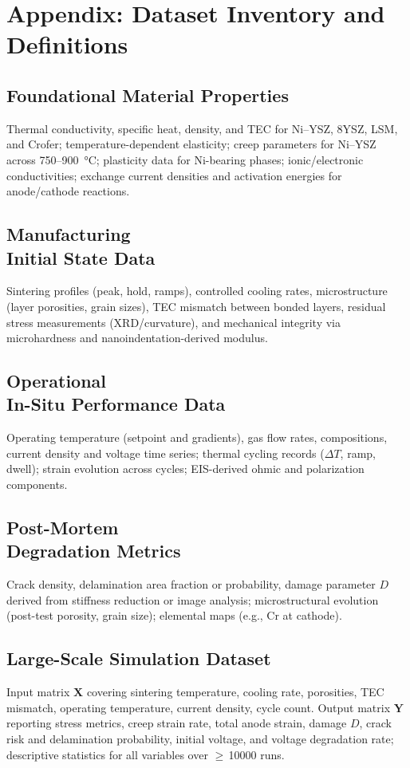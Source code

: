 \documentclass[conference]{IEEEtran}
\begin{document}
\section*{Appendix: Dataset Inventory and Definitions}
\subsection*{Foundational Material Properties}
Thermal conductivity, specific heat, density, and TEC for Ni–YSZ, 8YSZ, LSM, and Crofer; temperature-dependent elasticity; creep parameters for Ni–YSZ across \SI{750}{}–\SI{900}{\celsius}; plasticity data for Ni-bearing phases; ionic/electronic conductivities; exchange current densities and activation energies for anode/cathode reactions.

\subsection*{Manufacturing \\ Initial State Data}
Sintering profiles (peak, hold, ramps), controlled cooling rates, microstructure (layer porosities, grain sizes), TEC mismatch between bonded layers, residual stress measurements (XRD/curvature), and mechanical integrity via microhardness and nanoindentation-derived modulus.

\subsection*{Operational \\ In-Situ Performance Data}
Operating temperature (setpoint and gradients), gas flow rates, compositions, current density and voltage time series; thermal cycling records (\(\Delta T\), ramp, dwell); strain evolution across cycles; EIS-derived ohmic and polarization components.

\subsection*{Post-Mortem \\ Degradation Metrics}
Crack density, delamination area fraction or probability, damage parameter $D$ derived from stiffness reduction or image analysis; microstructural evolution (post-test porosity, grain size); elemental maps (e.g., Cr at cathode).

\subsection*{Large-Scale Simulation Dataset}
Input matrix $\mathbf{X}$ covering sintering temperature, cooling rate, porosities, TEC mismatch, operating temperature, current density, cycle count. Output matrix $\mathbf{Y}$ reporting stress metrics, creep strain rate, total anode strain, damage $D$, crack risk and delamination probability, initial voltage, and voltage degradation rate; descriptive statistics for all variables over $\geq$\,\num{10000} runs.
\end{document}
